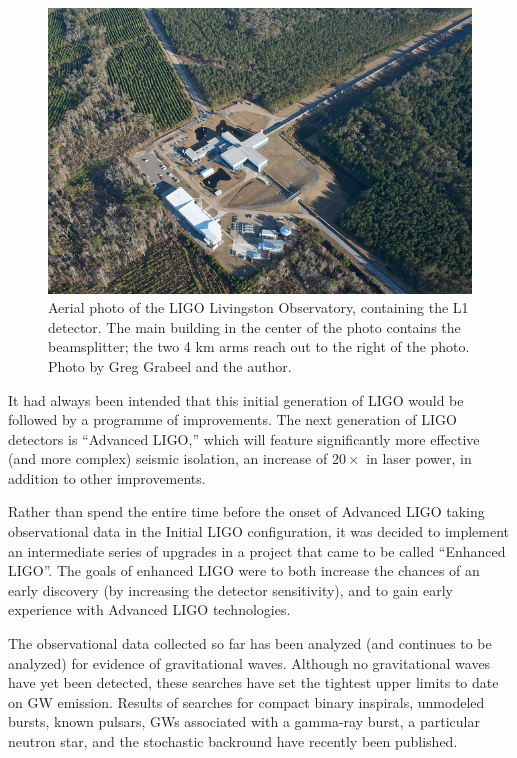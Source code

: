 \begin{figure}
\centerline{\includegraphics[width=0.8\columnwidth]{figures/5413583267_69eb527273_z.jpg}}
\caption[Aerial photo of LIGO Livingston Observatory]{
\label{fig:aerial-photo}Aerial photo of the LIGO Livingston Observatory, 
containing the L1 detector.  The main building in the center of the photo
contains the beamsplitter; the two 4 km arms reach out to the right of the 
photo.  Photo by Greg Grabeel and the author.  }
\end{figure}

It had always been intended that this initial generation of LIGO would
be followed by a programme of improvements\cite{Abramovici1992LIGO}.  The next generation of
LIGO detectors is ``Advanced LIGO,'' which will feature significantly
more effective (and more complex) seismic isolation, an increase of
$20\times$ in laser power, in addition to other improvements.

Rather than spend the entire time before the onset of Advanced LIGO
taking observational data in the Initial LIGO configuration, it was
decided to implement an intermediate series of upgrades in a project
that came to be called ``Enhanced
LIGO''\cite{Adhikari2006Enhanced,T050252,JoshSmithEnhancedAdvanced}.
The goals of enhanced LIGO were to both increase the chances of an
early discovery (by increasing the detector sensitivity), and to gain
early experience with Advanced LIGO technologies.

The observational data collected so far has been analyzed (and
continues to be analyzed) for evidence of gravitational waves.
Although no gravitational waves have yet been detected, these searches
have set the tightest upper limits to date on GW emission.  Results of
searches for compact binary inspirals\cite{S5CBCnospin, S5CBC5months},
unmodeled bursts\cite{Abbott2009Search, S5burst}, known pulsars\cite{S5knownpulsars},
GWs associated with a gamma-ray burst\cite{S5GRB070201},
a particular neutron star\cite{Abadie2010First},
and the stochastic backround\cite{S5NatureStochastic} have recently
been published.

